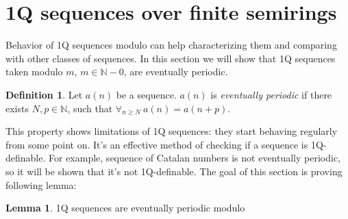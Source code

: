 \documentclass[12pt]{article}
\theoremstyle{definition}
\newtheorem{definition}{Definition}[section]
\newtheorem{lemma}[theorem]{Lemma}
\begin{document}



\section{1Q sequences over finite semirings}
\label{Sec1QFiniteSemirings}
Behavior of 1Q sequences modulo can help characterizing them and comparing with other classes of sequences. In this section we will show that 1Q sequences taken modulo $m$, $m \in \mathbb{N} - 0$, are eventually periodic.

\begin{definition}
    Let $a(n)$ be a sequence. $a(n)$ is \textit{eventually periodic} if there exists $N, p \in \mathbb{N}$, such that $\forall_{n \geq N} \ a(n) = a(n+p)$.
\end{definition}

This property shows limitations of 1Q sequences: they start behaving regularly from some point on. It's an effective method of checking if a sequence is 1Q-definable. For example, sequence of Catalan numbers is not eventually periodic, so it will be shown that it's not 1Q-definable. The goal of this section is proving following lemma:

\begin{lemma}
    \label{1QSequencesPeriodic}
    1Q sequences are eventually periodic modulo
\end{lemma}
\end{document}
